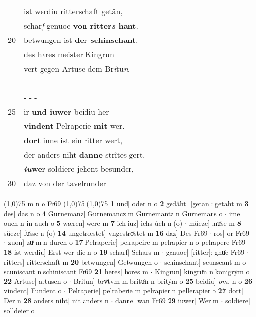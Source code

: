 \documentclass[8pt,a4paper,notitlepage]{article}
\begin{document}
\begin{table}[ht]
\begin{minipage}[t]{0.5\linewidth}
\begin{tabular}{rl}
 & ist werdiu ritterschaft getân,\\ 
 & schar\textit{f} genuoc \textbf{von ritter\textit{s} hant}.\\ 
20 & betwungen ist \textbf{der schinschant}.\\ 
 & des h\textit{e}res meister Kingrun\\ 
 & vert gegen Artuse dem Br\textit{i}tu\textit{n}.\\ 
 & \multicolumn{1}{l}{ - - - }\\ 
 & \multicolumn{1}{l}{ - - - }\\ 
25 & ir \textbf{und iuwer} beidiu her\\ 
 & \textbf{vindent} Pelraperie \textbf{mit} wer.\\ 
 & \textbf{dort} inne ist ein ritter wert,\\ 
 & der anders niht \textbf{danne} strîtes gert.\\ 
 & \textbf{\textit{iu}wer} soldiere jehent besunder,\\ 
30 & daz von der tavelrunder\\ 
\end{tabular}
\scriptsize
\line(1,0){75} \newline
m n o Fr69 \newline
\line(1,0){75} \newline
\newline
\line(1,0){75} \newline
\textbf{1} und] oder n o \textbf{2} gedâht] [getan]: getaht m \textbf{3} des] das n o \textbf{4} Gurnemanz] Gurnemancz m Gurnemantz n Gurnemans o  $\cdot$ ime] ouch n in auch o \textbf{5} wæren] were m \textbf{7} ich iuz] ichs úch n (o)  $\cdot$ müeze] muͯse m \textbf{8} süeze] fuͯsse n (o) \textbf{14} ungetrœstet] vngestroͯstet m \textbf{16} daz] Des Fr69  $\cdot$ ros] or Fr69  $\cdot$ zuon] zuͯ m n durch o \textbf{17} Pelraperie] pelrapeire m pelrapier n o pelrapere Fr69 \textbf{18} ist werdiu] Erst wer die n o \textbf{19} scharf] Schars m  $\cdot$ genuoc] [ritter]: gnuͦc Fr69  $\cdot$ ritters] ritterschaft m \textbf{20} betwungen] Getwungen o  $\cdot$ schinschant] scunscant m o scuniscant n schiniscant Fr69 \textbf{21} heres] hores m  $\cdot$ Kingrun] kingruͦn n konigrẏm o \textbf{22} Artuse] artusen o  $\cdot$ Britun] brvͯtvm m brituͦn n britẏm o \textbf{25} beidiu] \textit{om.} n o \textbf{26} vindent] Fundent o  $\cdot$ Pelraperie] pelraberie m pelrapier n pellerapier o \textbf{27} dort] Der n \textbf{28} anders niht] nit anders n  $\cdot$ danne] wan Fr69 \textbf{29} iuwer] Wer m  $\cdot$ soldiere] solldeier o \newline
\end{minipage}
\end{table}
\end{document}
